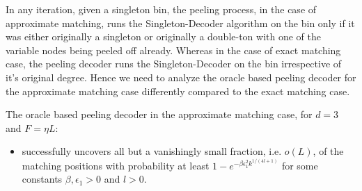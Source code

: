 \documentclass[journal,11pt,onecolumn]{IEEEtran}  %
\begin{document}
In any iteration, given a singleton bin, the peeling process, in the case of approximate matching, runs the Singleton-Decoder algorithm on the bin only if it was either originally a singleton or originally a double-ton with one of the variable nodes being peeled off already. Whereas  in the case of exact matching case, the peeling decoder runs the Singleton-Decoder on the bin irrespective of it's original degree. Hence we need to analyze the oracle based peeling decoder for the approximate matching case differently compared to the exact matching case. 
\begin{lemma}
The oracle based peeling decoder in the approximate matching case, for $d=3$ and $F=\eta L$:
\begin{itemize}
\item successfully uncovers all but a vanishingly small fraction, i.e. $o(L)$, of the matching positions with probability at least $1-e^{-\beta \epsilon_1^2k^{1/(4l+1)}}$ for some constants $\beta,\epsilon_1>0$ and $l>0.$
\end{itemize}
\end{lemma}





\end{document}
